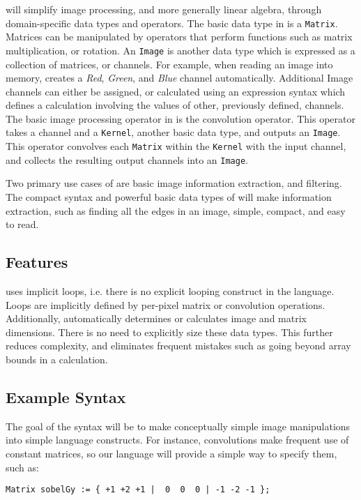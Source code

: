 \sys{} will simplify image processing, and more generally linear algebra, through
domain-specific data types and operators. The basic data type in \sys{} is a 
\texttt{Matrix}. Matrices can be manipulated by operators that perform functions
such as matrix multiplication, or rotation. An \texttt{Image} is another \sys{}
data type which is expressed as a collection of matrices, or channels. For example,
when reading an image into memory, \sys{} creates a \emph{Red}, \emph{Green}, and
\emph{Blue} channel automatically. Additional Image channels can either be assigned,
or calculated using an expression syntax which defines a calculation involving the
values of other, previously defined, channels. The basic image processing operator
in \sys{} is the convolution operator. This operator takes a channel and a
\texttt{Kernel}, another basic data type, and outputs an \texttt{Image}. This
operator convolves each \texttt{Matrix} within the \texttt{Kernel} with the input channel,
and collects the resulting output channels into an \texttt{Image}.

Two primary use cases of \sys{} are basic image information extraction, and
filtering. The compact syntax and powerful basic data types of \sys{} will make
information extraction, such as finding all the edges in an image, simple, compact,
and easy to read.

\subsection*{Features}
\sys{} uses implicit loops, i.e. there is no explicit looping construct in the
language. Loops are implicitly defined by per-pixel matrix or convolution
operations. Additionally, \sys{} automatically determines or calculates image and matrix
dimensions. There is no need to explicitly size these data types. This further
reduces complexity, and eliminates frequent mistakes such as going beyond array
bounds in a calculation.

\subsection*{Example Syntax}

The goal of the \sys{} syntax will be to make conceptually simple image
manipulations into simple language constructs. For instance, convolutions make
frequent use of constant matrices, so our language will provide a simple way
to specify them, such as:
\begin{lstlisting}[language=PLTF11]
    Matrix sobelGy := { +1 +2 +1 |  0  0  0 | -1 -2 -1 };
\end{lstlisting}

